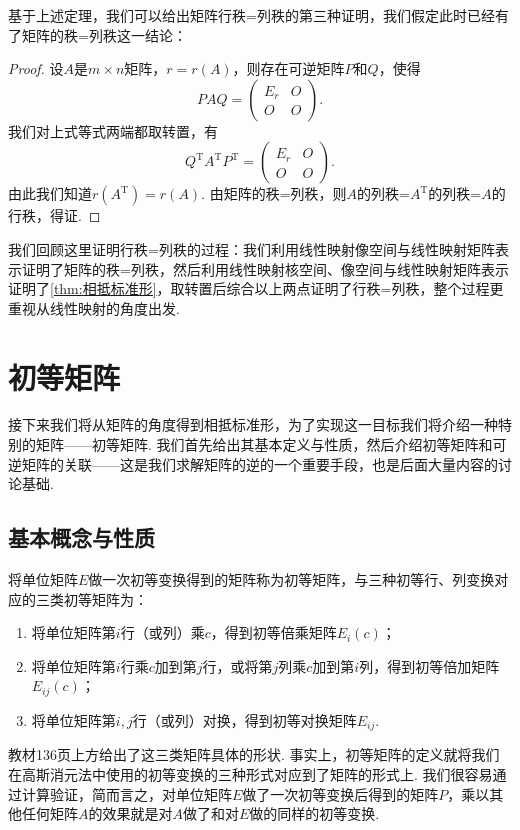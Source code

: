 基于上述定理，我们可以给出矩阵行秩=列秩的第三种证明，我们假定此时已经有了矩阵的秩=列秩这一结论：

\begin{proof} \label{pf:11:矩阵行秩=列秩}
    设$A$是$m\times n$矩阵，$r=r(A)$，则存在可逆矩阵$P$和$Q$，使得
    \[PAQ=\begin{pmatrix}
            E_r & O \\ O & O
        \end{pmatrix}.\]
    我们对上式等式两端都取转置，有
    \[Q^\mathrm{T}A^\mathrm{T}P^\mathrm{T}=\begin{pmatrix}
            E_r & O \\ O & O
        \end{pmatrix}.\]
    由此我们知道$r(A^\mathrm{T})=r(A)$. 由矩阵的秩=列秩，则$A$的列秩=$A^\mathrm{T}$的列秩=$A$的行秩，得证.
\end{proof}

我们回顾这里证明行秩=列秩的过程：我们利用线性映射像空间与线性映射矩阵表示证明了矩阵的秩=列秩，然后利用线性映射核空间、像空间与线性映射矩阵表示证明了\autoref{thm:相抵标准形}，取转置后综合以上两点证明了行秩=列秩，整个过程更重视从线性映射的角度出发.

\section{初等矩阵}

接下来我们将从矩阵的角度得到相抵标准形，为了实现这一目标我们将介绍一种特别的矩阵——初等矩阵. 我们首先给出其基本定义与性质，然后介绍初等矩阵和可逆矩阵的关联——这是我们求解矩阵的逆的一个重要手段，也是后面大量内容的讨论基础.

\subsection{基本概念与性质}

\begin{definition}{}{}
    将单位矩阵$E$做一次初等变换得到的矩阵称为初等矩阵，与三种初等行、列变换对应的三类初等矩阵为：
    \begin{enumerate}
        \item 将单位矩阵第$i$行（或列）乘$c$，得到初等倍乘矩阵$E_i(c)$；

        \item 将单位矩阵第$i$行乘$c$加到第$j$行，或将第$j$列乘$c$加到第$i$列，得到初等倍加矩阵$E_{ij}(c)$；

        \item 将单位矩阵第$i,j$行（或列）对换，得到初等对换矩阵$E_{ij}$.
    \end{enumerate}
\end{definition}
教材136页上方给出了这三类矩阵具体的形状. 事实上，初等矩阵的定义就将我们在高斯消元法中使用的初等变换的三种形式对应到了矩阵的形式上. 我们很容易通过计算验证，简而言之，对单位矩阵$E$做了一次初等变换后得到的矩阵$P$，乘以其他任何矩阵$A$的效果就是对$A$做了和对$E$做的同样的初等变换.

